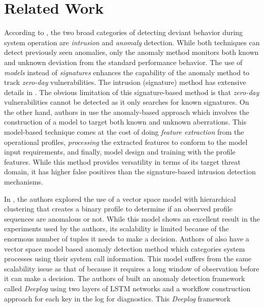 \section{Related Work}
\label{sec:related-work}
According to \cite{chandola2009anomaly}, the two broad 
categories of detecting 
deviant behavior during system operation are \emph{intrusion} 
and 
\emph{anomaly} detection. While both techniques can detect 
previously seen 
anomalies, only the anomaly method monitors both known and 
unknown deviation 
from the standard performance behavior. The use of 
\emph{models} instead of 
\emph{signatures} enhances the capability of the anomaly 
method to track 
\emph{zero-day} vulnerabilities. The intrusion (signature) 
method has extensive 
details in \cite{garcia2009anomaly}. The obvious limitation 
of this 
signature-based method is that \emph{zero-day} 
vulnerabilities cannot be 
detected as it only searches for known signatures. On the 
other hand, authors 
in 
\cite{Ezeme2017,du2017deeplog,xu2009largescale,yu2016cloudseer}
 use the 
anomaly-based approach which involves the construction of a 
model to target 
both known and unknown aberrations. This model-based 
technique comes at the 
cost of doing \emph{feature extraction} from the operational 
profiles, 
\emph{processing} the extracted features to conform to the 
model input 
requirements, and finally, model design and training with the 
profile features. 
While this method provides versatility in terms of its target 
threat domain, it 
has higher false positives than the signature-based intrusion 
detection 
mechanisms.\par 
In \cite{Ezeme2017}, the authors explored the use of a vector 
space model with 
hierarchical clustering that creates a binary profile to 
determine if an 
observed profile sequences are anomalous or not. While this 
model shows an 
excellent result in the experiments used by the authors, its 
scalability is 
limited because of the enormous number of tuples it needs to 
make a decision. 
Authors of \cite{yoon2017learning} also have a vector space 
model based anomaly 
detection method which categories system processes using 
their system call 
information. This model suffers from the same scalability 
issue as that of 
\cite{Ezeme2017} because it requires a long window of 
observation before it can 
make a decision. The authors of \cite{du2017deeplog} built an 
anomaly detection 
framework called \emph{Deeplog} using two layers of LSTM 
networks and a 
workflow construction approach for each 
key in the log for diagnostics. This \emph{Deeplog} framework 
